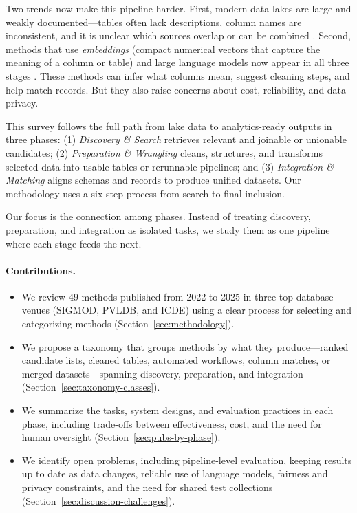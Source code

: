 \documentclass[sigconf,nonacm]{acmart}
\begin{document}
Two trends now make this pipeline harder.
First, modern data lakes are large and weakly documented---tables often lack descriptions, column names are inconsistent, and it is unclear which sources overlap or can be combined \cite{10.1145/3555041.3589409,10.14778/3750601.3750694}.
Second, methods that use \emph{embeddings} (compact numerical vectors that capture the meaning of a column or table) and large language models now appear in all three stages \cite{10.14778/3659437.3659461,10.14778/3611540.3611624,10.14778/3742728.3742757}. These methods can infer what columns mean, suggest cleaning steps, and help match records. But they also raise concerns about cost, reliability, and data privacy.

This survey follows the full path from lake data to analytics-ready outputs in three phases:
(1) \emph{Discovery \& Search} retrieves relevant and joinable or unionable candidates;
(2) \emph{Preparation \& Wrangling} cleans, structures, and transforms selected data into usable tables or rerunnable pipelines; and
(3) \emph{Integration \& Matching} aligns schemas and records to produce unified datasets.
Our methodology uses a six-step process from search to final inclusion.

Our focus is the connection among phases. Instead of treating discovery, preparation, and integration as isolated tasks, we study them as one pipeline where each stage feeds the next.

\paragraph{Contributions.}
\begin{itemize}
  \item We review 49 methods published from 2022 to 2025 in three top database venues (SIGMOD, PVLDB, and ICDE) using a clear process for selecting and categorizing methods (Section~\ref{sec:methodology}).
  \item We propose a taxonomy that groups methods by what they produce---ranked candidate lists, cleaned tables, automated workflows, column matches, or merged datasets---spanning discovery, preparation, and integration (Section~\ref{sec:taxonomy-classes}).
  \item We summarize the tasks, system designs, and evaluation practices in each phase, including trade-offs between effectiveness, cost, and the need for human oversight (Section~\ref{sec:pubs-by-phase}).
  \item We identify open problems, including pipeline-level evaluation, keeping results up to date as data changes, reliable use of language models, fairness and privacy constraints, and the need for shared test collections (Section~\ref{sec:discussion-challenges}).
\end{itemize}
\end{document}
